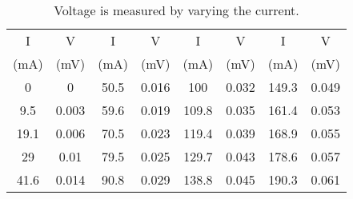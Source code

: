 \begin{table}[H]
	\centering
	\caption{Voltage is measured by varying the current.}
	\label{tabal}
	\begin{tabular}{|c|c||c|c||c|c||c|c|}
		\hline
		I    & V     & I    & V    & I     & V     & I    & V \\        
		(mA)    & (mV)     & (mA)    & (mV)     & (mA)     & (mV)     & (mA)     & (mV)     \\ \hline
		0    & 0     & 50.5 & 0.016 & 100   & 0.032 & 149.3 & 0.049 \\ \hline
		9.5  & 0.003 & 59.6 & 0.019 & 109.8 & 0.035 & 161.4 & 0.053 \\ \hline
		19.1 & 0.006 & 70.5 & 0.023 & 119.4 & 0.039 & 168.9 & 0.055 \\ \hline
		29   & 0.01  & 79.5 & 0.025 & 129.7 & 0.043 & 178.6 & 0.057 \\ \hline
		41.6 & 0.014 & 90.8 & 0.029 & 138.8 & 0.045 & 190.3 & 0.061 \\ \hline
	\end{tabular}
\end{table}